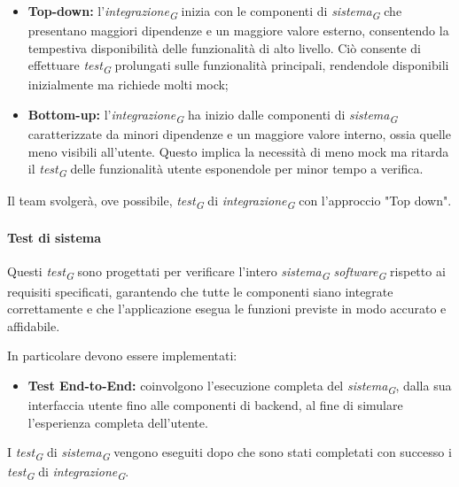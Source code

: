 \begin{itemize}
    \item \textbf{Top-down:}
        l'\textit{integrazione}\textsubscript{\textit{G}} inizia con le componenti di \textit{sistema}\textsubscript{\textit{G}} che presentano maggiori dipendenze e un maggiore valore esterno, consentendo la tempestiva disponibilità delle funzionalità di alto livello. Ciò consente di effettuare \textit{test}\textsubscript{\textit{G}} prolungati sulle funzionalità principali, rendendole disponibili inizialmente ma richiede molti mock;
    \item \textbf{Bottom-up:}
        l'\textit{integrazione}\textsubscript{\textit{G}} ha inizio dalle componenti di \textit{sistema}\textsubscript{\textit{G}} caratterizzate da minori dipendenze e un maggiore valore interno, ossia quelle meno visibili all'utente. Questo implica la necessità di meno mock ma ritarda il \textit{test}\textsubscript{\textit{G}} delle funzionalità utente esponendole per minor tempo a verifica.
\end{itemize}

Il team svolgerà, ove possibile, \textit{test}\textsubscript{\textit{G}} di \textit{integrazione}\textsubscript{\textit{G}} con l'approccio "Top down". 

\paragraph{Test di sistema}
Questi \textit{test}\textsubscript{\textit{G}} sono progettati per verificare l'intero \textit{sistema}\textsubscript{\textit{G}} \textit{software}\textsubscript{\textit{G}} rispetto ai requisiti specificati, garantendo che tutte le componenti siano integrate correttamente e che l'applicazione esegua le funzioni previste in modo accurato e affidabile. 

\vspace{0.2cm}

In particolare devono essere implementati: 
\begin{itemize}
    \item \textbf{Test End-to-End:} 
        coinvolgono l'esecuzione completa del \textit{sistema}\textsubscript{\textit{G}}, dalla sua interfaccia utente fino alle componenti di backend, al fine di simulare l'esperienza completa dell'utente.
\end{itemize} 

I \textit{test}\textsubscript{\textit{G}} di \textit{sistema}\textsubscript{\textit{G}} vengono eseguiti dopo che sono stati completati con successo i \textit{test}\textsubscript{\textit{G}} di \textit{integrazione}\textsubscript{\textit{G}}. 

